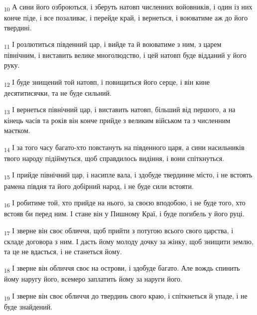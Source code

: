 \begin{tcolorbox}
\textsubscript{10} А сини його озброються, і зберуть натовп численних войовників, і один із них конче піде, і все позаливає, і перейде край, і вернеться, і воюватиме аж до його твердині.
\end{tcolorbox}
\begin{tcolorbox}
\textsubscript{11} І розлютиться південний цар, і вийде та й воюватиме з ним, з царем північним, і виставить велике многолюдство, і цей натовп буде відданий у його руку.
\end{tcolorbox}
\begin{tcolorbox}
\textsubscript{12} І буде знищений той натовп, і повищиться його серце, і він кине десятитисячки, та не буде сильний.
\end{tcolorbox}
\begin{tcolorbox}
\textsubscript{13} І вернеться північний цар, і виставить натовп, більший від першого, а на кінець часів та років він конче прийде з великим військом та з численним маєтком.
\end{tcolorbox}
\begin{tcolorbox}
\textsubscript{14} І за того часу багато-хто повстануть на південного царя, а сини насильників твого народу підіймуться, щоб справдилось видіння, і вони спіткнуться.
\end{tcolorbox}
\begin{tcolorbox}
\textsubscript{15} І прийде північний цар, і насипле вала, і здобуде твердинне місто, і не встоять рамена півдня та його добірний народ, і не буде сили встояти.
\end{tcolorbox}
\begin{tcolorbox}
\textsubscript{16} І робитиме той, хто прийде на нього, за своєю вподобою, і не буде того, хто встояв би перед ним. І стане він у Пишному Краї, і буде погибель у його руці.
\end{tcolorbox}
\begin{tcolorbox}
\textsubscript{17} І зверне він своє обличчя, щоб прийти з потугою всього свого царства, і складе договора з ним. І дасть йому молоду дочку за жінку, щоб знищити землю, та це не вдасться, і не станеться йому.
\end{tcolorbox}
\begin{tcolorbox}
\textsubscript{18} І зверне він обличчя своє на острови, і здобуде багато. Але вождь спинить йому наругу його, всемеро заплатить йому за наруги його.
\end{tcolorbox}
\begin{tcolorbox}
\textsubscript{19} І зверне він своє обличчя до твердинь свого краю, і спіткнеться й упаде, і не буде знайдений.
\end{tcolorbox}
